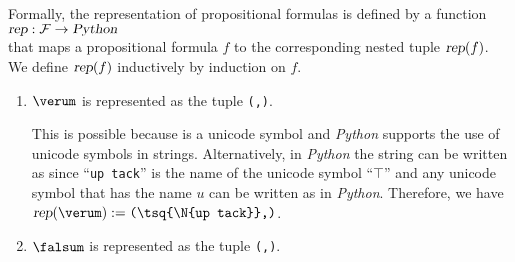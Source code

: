Formally, the representation of propositional formulas is defined by a function 
\\[0.2cm]
\hspace*{1.3cm}
$\textsl{rep}: \mathcal{F} \rightarrow \textsl{Python}$
\\[0.2cm]
that maps a propositional formula $f$ to the corresponding nested tuple 
$\textsl{rep}(f)$.  We define $\textsl{rep}(f)$ inductively by induction on $f$.
\begin{enumerate}
\item $\verum$ is represented as the tuple \texttt{(\tsq{$\top$},)}.
  
      This is possible because \texttt{\tsq{$\top$}} is a unicode symbol and \textsl{Python} supports the use of unicode
      symbols in strings.   Alternatively, in \textsl{Python} the string \texttt{\tsq{$\top$}} can be written as
      \texttt{} since ``\texttt{up tack}'' is the name of the unicode symbol
      ``$\top$'' and any unicode symbol that has the name  $u$ can be written 
      as \texttt{} in \textsl{Python}.  Therefore, we have
      \\[0.2cm]
      \hspace*{1.3cm}
      $\textsl{rep}(\verum) := \texttt{(\tsq{\symbol{92}N\{up tack\}},)}$.
\item $\falsum$  is represented as the tuple \texttt{(\tsq{$\falsum$},)}.
      

\end{enumerate}
